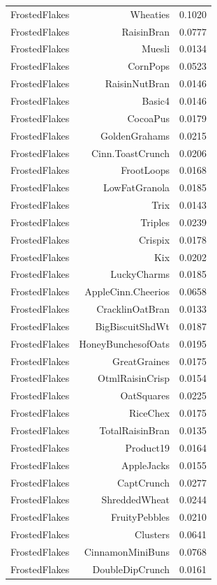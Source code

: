 \begin{longtable}{@{}lrr@{}}
FrostedFlakes & Wheaties & 0.1020 \\
FrostedFlakes & RaisinBran & 0.0777 \\
FrostedFlakes & Muesli & 0.0134 \\
FrostedFlakes & CornPops & 0.0523 \\
FrostedFlakes & RaisinNutBran & 0.0146 \\
FrostedFlakes & Basic4 & 0.0146 \\
FrostedFlakes & CocoaPus & 0.0179 \\
FrostedFlakes & GoldenGrahams & 0.0215 \\
FrostedFlakes & Cinn.ToastCrunch & 0.0206 \\
FrostedFlakes & FrootLoops & 0.0168 \\
FrostedFlakes & LowFatGranola & 0.0185 \\
FrostedFlakes & Trix & 0.0143 \\
FrostedFlakes & Triples & 0.0239 \\
FrostedFlakes & Crispix & 0.0178 \\
FrostedFlakes & Kix & 0.0202 \\
FrostedFlakes & LuckyCharms & 0.0185 \\
FrostedFlakes & AppleCinn.Cheerios & 0.0658 \\
FrostedFlakes & CracklinOatBran & 0.0133 \\
FrostedFlakes & BigBiscuitShdWt & 0.0187 \\
FrostedFlakes & HoneyBunchesofOats & 0.0195 \\
FrostedFlakes & GreatGraines & 0.0175 \\
FrostedFlakes & OtmlRaisinCrisp & 0.0154 \\
FrostedFlakes & OatSquares & 0.0225 \\
FrostedFlakes & RiceChex & 0.0175 \\
FrostedFlakes & TotalRaisinBran & 0.0135 \\
FrostedFlakes & Product19 & 0.0164 \\
FrostedFlakes & AppleJacks & 0.0155 \\
FrostedFlakes & CaptCrunch & 0.0277 \\
FrostedFlakes & ShreddedWheat & 0.0244 \\
FrostedFlakes & FruityPebbles & 0.0210 \\
FrostedFlakes & Clusters & 0.0641 \\
FrostedFlakes & CinnamonMiniBuns & 0.0768 \\
FrostedFlakes & DoubleDipCrunch & 0.0161 \\

\end{longtable}
